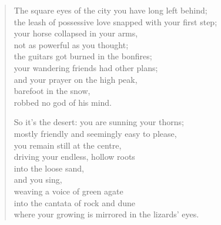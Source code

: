 \begin{verse}

The square eyes of the city you have long left behind;\\
the leash of possessive love snapped with your first step;\\
your horse collapsed in your arms,\\
not as powerful as you thought;\\
the guitars got burned in the bonfires;\\
your wandering friends had other plans;\\
and your prayer on the high peak,\\
barefoot in the snow,\\
robbed no god of his mind.

So it's the desert: you are sunning your thorns;\\
mostly friendly and seemingly easy to please,\\
you remain still at the centre,\\
driving your endless, hollow roots\\
into the loose sand,\\
and you sing,\\
weaving a voice of green agate\\
into the cantata of rock and dune\\
where your growing is mirrored in the lizards' eyes.

\end{verse}
